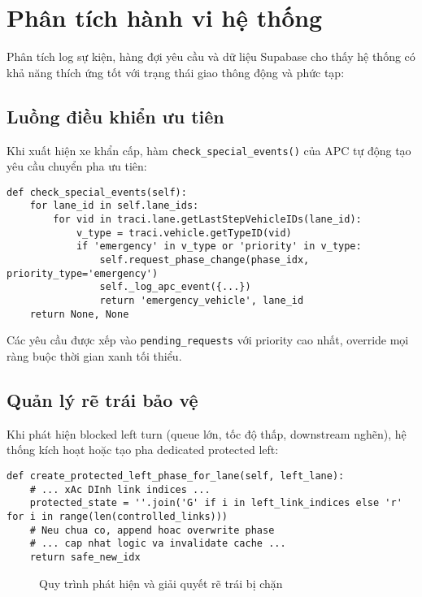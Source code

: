 \section{Phân tích hành vi hệ thống}

Phân tích log sự kiện, hàng đợi yêu cầu và dữ liệu Supabase cho thấy hệ thống có khả năng thích ứng tốt với trạng thái giao thông động và phức tạp:

\subsection{Luồng điều khiển ưu tiên}

Khi xuất hiện xe khẩn cấp, hàm \texttt{check\_special\_events()} của APC tự động tạo yêu cầu chuyển pha ưu tiên:

\begin{lstlisting}[style=py,caption={Phát hiện và phục vụ xe ưu tiên}]
def check_special_events(self):
    for lane_id in self.lane_ids:
        for vid in traci.lane.getLastStepVehicleIDs(lane_id):
            v_type = traci.vehicle.getTypeID(vid)
            if 'emergency' in v_type or 'priority' in v_type:
                self.request_phase_change(phase_idx, priority_type='emergency')
                self._log_apc_event({...})
                return 'emergency_vehicle', lane_id
    return None, None
\end{lstlisting}

Các yêu cầu được xếp vào \texttt{pending\_requests} với priority cao nhất, override mọi ràng buộc thời gian xanh tối thiểu.

\subsection{Quản lý rẽ trái bảo vệ}

Khi phát hiện blocked left turn (queue lớn, tốc độ thấp, downstream nghẽn), hệ thống kích hoạt hoặc tạo pha dedicated protected left:

\begin{lstlisting}[style=py,caption={Tạo pha protected left động}]
def create_protected_left_phase_for_lane(self, left_lane):
    # ... xAc DInh link indices ...
    protected_state = ''.join('G' if i in left_link_indices else 'r' for i in range(len(controlled_links)))
    # Neu chua co, append hoac overwrite phase
    # ... cap nhat logic va invalidate cache ...
    return safe_new_idx
\end{lstlisting}

\begin{figure}[H]
    \centering
    \caption{Quy trình phát hiện và giải quyết rẽ trái bị chặn}
    \label{fig:left_turn_flow}
\end{figure}

